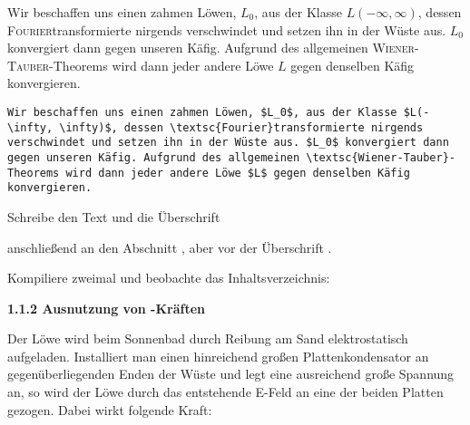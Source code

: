 \documentclass["WS\space 16-17\space -\space LaTeX-Kurs\space -\space Praesentation\space -\space 1.tex"]{subfiles}
\begin{document}
\begin{frame}[fragile]
	\Losung
	\begin{outputbox}
		Wir beschaffen uns einen zahmen Löwen, $L_0$, aus der Klasse $L(- \infty, \infty)$, dessen \textsc{Fourier}transformierte nirgends verschwindet und setzen ihn in der Wüste aus. $L_0$ konvergiert dann gegen unseren Käfig. Aufgrund des allgemeinen \textsc{Wiener-Tauber}-Theorems wird dann jeder andere Löwe $L$ gegen denselben Käfig konvergieren.
	\end{outputbox}

	\Code
	\begin{lstlisting}[gobble=4]
    Wir beschaffen uns einen zahmen Löwen, $L_0$, aus der Klasse $L(- \infty, \infty)$, dessen \textsc{Fourier}transformierte nirgends verschwindet und setzen ihn in der Wüste aus. $L_0$ konvergiert dann gegen unseren Käfig. Aufgrund des allgemeinen \textsc{Wiener-Tauber}-Theorems wird dann jeder andere Löwe $L$ gegen denselben Käfig konvergieren.
	\end{lstlisting}
\end{frame}
\begin{frame}[fragile]
	\Aufgabee
  Schreibe den Text und die Überschrift

  \textrm{}

  anschließend an den Abschnitt , aber vor der Überschrift .

  Kompiliere zweimal und beobachte das Inhaltsverzeichnis:
  
	\begin{outputbox}
		{ \large\textbf{1.1.2 Ausnutzung von -Kräften}}
		
		Der Löwe wird beim Sonnenbad durch Reibung am Sand elektrostatisch aufgeladen. Installiert man einen hinreichend großen Plattenkondensator an gegenüberliegenden Enden der Wüste und legt eine ausreichend große Spannung an, so wird der Löwe durch das entstehende E-Feld an eine der beiden Platten gezogen. Dabei wirkt folgende Kraft: 
	\end{outputbox}
\end{frame}
\end{document}
